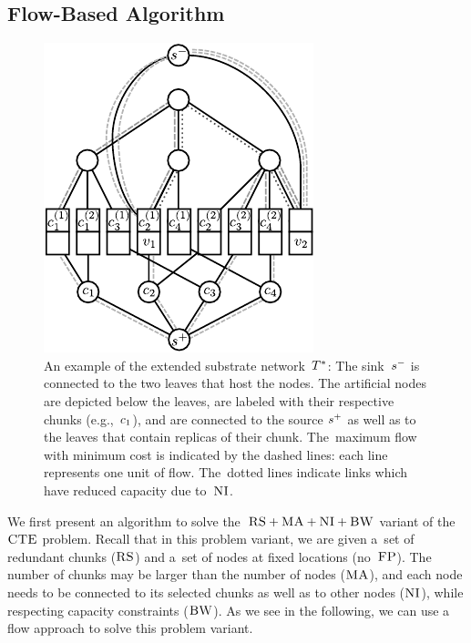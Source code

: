 \subsection{Flow-Based Algorithm}\label{ssec:flow}

\begin{figure}
\centering
\includegraphics[width=0.5\columnwidth]{figs/static-mapping/flow_ma_cv}
\caption{An example of the extended substrate
network~$T^*$: The sink~$s^{-}$ is connected to the two leaves that host the
nodes. The artificial nodes are depicted below the leaves, are labeled with
their respective chunks (e.g.,~$c_1$), and are connected to the source
$s^{+}$ as well as to the leaves that contain replicas of their chunk.
The~maximum flow with minimum cost is indicated by the dashed lines: each line
represents one unit of flow. The~dotted lines indicate links which have reduced
capacity due to~$\textsc{NI}$.}
\label{fig:flow_construction}
\end{figure}





We first present an algorithm to solve the~$\textsc{RS}+\textsc{MA}+\textsc{NI}+\textsc{BW}$ variant of the $\textsc{CTE}$ problem.
Recall that in this problem variant,
we are given a~set of redundant chunks ($\textsc{RS}$) and a~set of
nodes
at fixed locations (no~$\textsc{FP}$). The number of chunks may be larger than the number
of nodes ($\textsc{MA}$), and each node needs to be connected
to its selected chunks as well as to other nodes ($\textsc{NI}$), while respecting
capacity constraints ($\textsc{BW}$).
As we see in the following, we can use a flow approach to solve this
problem variant.



